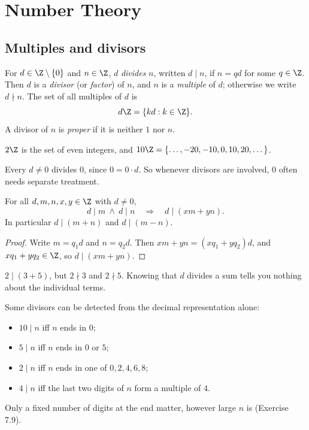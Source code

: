 \newpage

\section{Number Theory}
\label{sec:numbertheory}

\subsection{Multiples and divisors}
\label{sec:7-1}

\begin{definition}[Divisibility]
For $d\in\Z\setminus\{0\}$ and $n\in\Z$, $d$ \emph{divides} $n$, written $d\mid n$, if $n=qd$ for some $q\in\Z$. Then $d$ is a \emph{divisor} (or \emph{factor}) of $n$, and $n$ is a \emph{multiple} of $d$; otherwise we write $d\nmid n$. The set of all multiples of $d$ is
\[
d\Z=\{kd : k\in\Z\}.
\]
A divisor of $n$ is \emph{proper} if it is neither $1$ nor $n$.
\end{definition}

\begin{example}
$2\Z$ is the set of even integers, and $10\Z=\{\dots,-20,-10,0,10,20,\dots\}$.
\end{example}

\begin{note}
Every $d\ne0$ divides $0$, since $0=0\cdot d$. So whenever divisors are involved, $0$ often needs separate treatment.
\end{note}

\begin{proposition}
\label{thm:divlinear}
For all $d,m,n,x,y\in\Z$ with $d\ne0$,
\[
d\mid m \ \wedge\ d\mid n \quad\Longrightarrow\quad d\mid (xm+yn).
\]
In particular $d\mid(m+n)$ and $d\mid(m-n)$.
\end{proposition}
\begin{proof}
Write $m=q_1d$ and $n=q_2d$. Then $xm+yn=(xq_1+yq_2)d$, and $xq_1+yq_2\in\Z$, so $d\mid(xm+yn)$.
\end{proof}

\begin{note}
$2\mid(3+5)$, but $2\nmid3$ and $2\nmid5$. Knowing that $d$ divides a sum tells you nothing about the individual terms.
\end{note}

\begin{note}
Some divisors can be detected from the decimal representation alone:
\begin{itemize}
    \item $10\mid n$ iff $n$ ends in $0$;
    \item $5\mid n$ iff $n$ ends in $0$ or $5$;
    \item $2\mid n$ iff $n$ ends in one of $0,2,4,6,8$;
    \item $4\mid n$ iff the last two digits of $n$ form a multiple of $4$.
\end{itemize}
Only a fixed number of digits at the end matter, however large $n$ is (Exercise 7.9).
\end{note}

